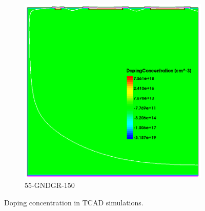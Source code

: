 \begin{figure}[htbp]
\begin{subfigure}[b]{0.5\linewidth}
    \includegraphics[width=\textwidth]{figures/TCAD/dopingConcentration_55_GNDGR_150.png}
    \caption{55-GNDGR-150}
  \end{subfigure}
  \caption{Doping concentration in TCAD simulations.}
  \label{fig:TCAD_dopingConcentration}
\end{figure}
